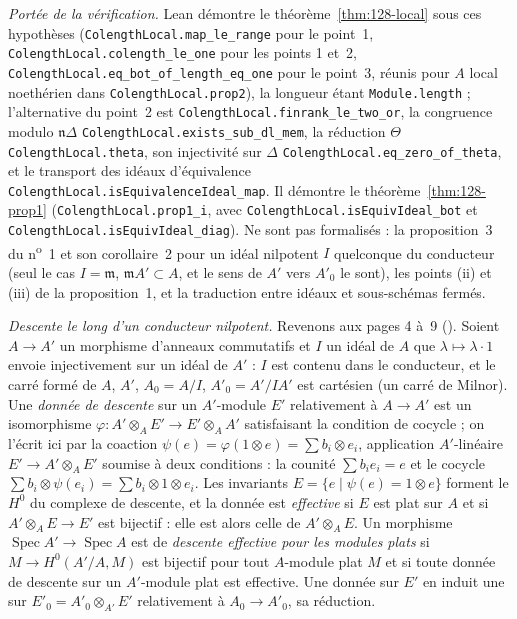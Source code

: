 \begingroup\raggedright
\noindent\emph{Portée de la vérification.} Lean démontre le théorème~\ref{thm:128-local} sous ces hypothèses (\texttt{ColengthLocal.\allowbreak{}map\_le\_range} pour le point~1, \texttt{ColengthLocal.\allowbreak{}colength\_le\_one} pour les points 1 et~2, \texttt{ColengthLocal.\allowbreak{}eq\_bot\_of\_length\_eq\_one} pour le point~3, réunis pour $A$ local noethérien dans \texttt{ColengthLocal.\allowbreak{}prop2}), la longueur étant \texttt{Module.\allowbreak{}length} ; l'alternative du point~2 est \texttt{ColengthLocal.\allowbreak{}finrank\_le\_two\_or}, la congruence modulo $\mathfrak n \Delta$ \texttt{ColengthLocal.\allowbreak{}exists\_sub\_dl\_mem}, la réduction $\Theta$ \texttt{ColengthLocal.\allowbreak{}theta}, son injectivité sur $\Delta$ \texttt{ColengthLocal.\allowbreak{}eq\_zero\_of\_theta}, et le transport des idéaux d'équivalence \texttt{ColengthLocal.\allowbreak{}isEquivalenceIdeal\_map}. Il démontre le théorème~\ref{thm:128-prop1} (\texttt{ColengthLocal.\allowbreak{}prop1\_i}, avec \texttt{ColengthLocal.\allowbreak{}isEquivIdeal\_bot} et \texttt{ColengthLocal.\allowbreak{}isEquivIdeal\_diag}). Ne sont pas formalisés : la proposition~3 du n\textsuperscript{o}~1 et son corollaire~2 pour un idéal nilpotent $I$ quelconque du conducteur (seul le cas $I = \mathfrak m$, $\mathfrak m A' \subset A$, et le sens de $A'$ vers $A'_0$ le sont), les points (ii) et (iii) de la proposition~1, et la traduction entre idéaux et sous-schémas fermés.\par\endgroup


\noindent\emph{Descente le long d'un conducteur nilpotent.} Revenons aux pages 4 à~9 (). Soient $A \to A'$ un morphisme d'anneaux commutatifs et $I$ un idéal de $A$ que $\lambda \mapsto \lambda \cdot 1$ envoie injectivement sur un idéal de $A'$ : $I$ est contenu dans le conducteur, et le carré formé de $A$, $A'$, $A_0 = A/I$, $A'_0 = A'/IA'$ est cartésien (un carré de Milnor). Une \emph{donnée de descente} sur un $A'$-module $E'$ relativement à $A \to A'$ est un isomorphisme $\varphi : A' \otimes_A E' \to E' \otimes_A A'$ satisfaisant la condition de cocycle ; on l'écrit ici par la coaction $\psi(e) = \varphi(1 \otimes e) = \sum b_i \otimes e_i$, application $A'$-linéaire $E' \to A' \otimes_A E'$ soumise à deux conditions : la counité $\sum b_i e_i = e$ et le cocycle $\sum b_i \otimes \psi(e_i) = \sum b_i \otimes 1 \otimes e_i$. Les invariants $E = \{e \mid \psi(e) = 1 \otimes e\}$ forment le $H^0$ du complexe de descente, et la donnée est \emph{effective} si $E$ est plat sur $A$ et si $A' \otimes_A E \to E'$ est bijectif : elle est alors celle de $A' \otimes_A E$. Un morphisme $\operatorname{Spec} A' \to \operatorname{Spec} A$ est de \emph{descente effective pour les modules plats} si $M \to H^0(A'/A, M)$ est bijectif pour tout $A$-module plat $M$ et si toute donnée de descente sur un $A'$-module plat est effective. Une donnée sur $E'$ en induit une sur $E'_0 = A'_0 \otimes_{A'} E'$ relativement à $A_0 \to A'_0$, sa réduction.

